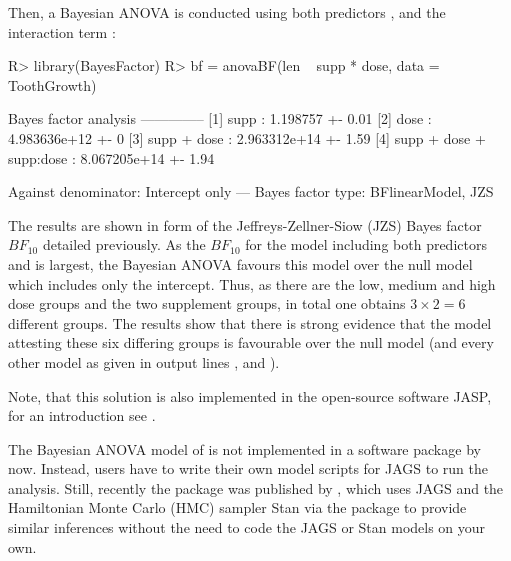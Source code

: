 

Then, a Bayesian ANOVA is conducted using both predictors ,  and the interaction term :
\begin{example}
R> library(BayesFactor)
R> bf = anovaBF(len ~ supp * dose, data = ToothGrowth)

Bayes factor analysis
--------------
[1] supp                    : 1.198757      +- 0.01%
[2] dose                    : 4.983636e+12  +- 0%
[3] supp + dose             : 2.963312e+14  +- 1.59%
[4] supp + dose + supp:dose : 8.067205e+14  +- 1.94%

Against denominator:
  Intercept only 
---
Bayes factor type: BFlinearModel, JZS	
\end{example}

The results are shown in form of the Jeffreys-Zellner-Siow (JZS) Bayes factor $BF_{10}$ detailed previously. As the $BF_{10}$ for the model including both predictors  and  is largest, the Bayesian ANOVA favours this model over the null model which includes only the intercept. Thus, as there are the low, medium and high dose groups and the two supplement groups, in total one obtains $3=6$ different groups. The results show that there is strong evidence that the model attesting these six differing groups is favourable over the null model (and every other model as given in output lines \code{[1]}, \code{[2]} and \code{[3]}).

Note, that this solution is also implemented in the open-source software JASP, for an introduction see \cite{Bergh2019ANOVAJasp}.

The Bayesian ANOVA model of \cite{Kruschke2015} is not implemented in a software package by now. Instead, users have to write their own model scripts for JAGS \citep{Plummer2003} to run the analysis. Still, recently the package  was published by \cite{BANOVA2019}, which uses JAGS \citep{Plummer2003} and the Hamiltonian Monte Carlo (HMC) sampler Stan \citep{Carpenter2017} via the package  \citep{RStan2020} to provide similar inferences without the need to code the JAGS or Stan models on your own.



